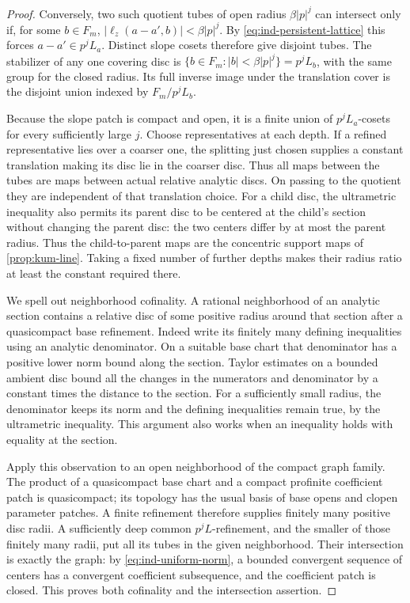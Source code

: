 \begin{proof}
Conversely, two such quotient tubes of open radius
$\beta|p|^j$ can intersect only if, for some $b\in F_m$,
$|\ell_z(a-a',b)|<\beta|p|^j$.  By
\cref{eq:ind-persistent-lattice} this forces
$a-a'\in p^jL_a$.  Distinct slope cosets therefore give disjoint
tubes.  The stabilizer of any one covering disc is
$\{b\in F_m:|b|<\beta|p|^j\}=p^jL_b$, with the same group for the
closed radius.  Its full inverse image under the translation cover
is the disjoint union indexed by $F_m/p^jL_b$.

Because the slope patch is compact and open, it is a finite union
of $p^jL_a$-cosets for every sufficiently large $j$.  Choose
representatives at each depth.  If a refined representative lies
over a coarser one, the splitting just chosen supplies a constant
translation making its disc lie in the coarser disc.  Thus all
maps between the tubes are maps between actual relative analytic
discs.  On passing to the quotient they are independent of that
translation choice.
For a child disc, the ultrametric inequality also permits its parent
disc to be centered at the child's section without changing the
parent disc: the two centers differ by at most the parent radius.
Thus the child-to-parent maps are the concentric support maps of
\cref{prop:kum-line}.  Taking a fixed number of further depths makes
their radius ratio at least the constant required there.

We spell out neighborhood cofinality.  A rational neighborhood of
an analytic section contains a relative disc of some positive
radius around that section after a quasicompact base refinement.
Indeed write its finitely many defining inequalities using an
analytic denominator.  On a suitable base chart that denominator
has a positive lower norm bound along the section.  Taylor
estimates on a bounded ambient disc bound all the changes in the
numerators and denominator by a constant times the distance to
the section.  For a sufficiently small radius, the denominator
keeps its norm and the defining inequalities remain true, by the
ultrametric inequality.  This argument also works when an
inequality holds with equality at the section.

Apply this observation to an open neighborhood of the compact
graph family.  The product of a quasicompact base chart and a
compact profinite coefficient patch is quasicompact; its topology
has the usual basis of base opens and clopen parameter patches.
A finite refinement therefore supplies finitely many positive
disc radii.  A sufficiently deep common $p^jL$-refinement, and the
smaller of those finitely many radii, put all its tubes in the
given neighborhood.  Their intersection is exactly the graph:
by \cref{eq:ind-uniform-norm}, a bounded convergent sequence of
centers has a convergent coefficient subsequence, and the
coefficient patch is closed.  This proves both cofinality and the
intersection assertion.


\end{proof}
